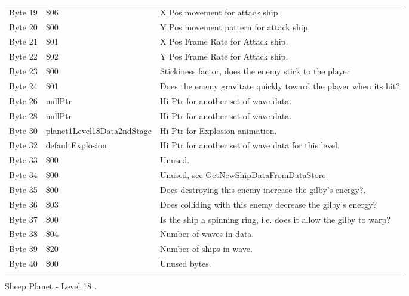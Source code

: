 \begin{figure}[H]
{\begin{adjustbox}{width=12cm}
\begin{tabular}{lll}
 Byte 19 & \$06                        & X Pos movement for attack ship.                                    \\
 Byte 20 & \$00                        & Y Pos movement pattern for attack ship.                            \\
 Byte 21 & \$01                        & X Pos Frame Rate for Attack ship.                                  \\
 Byte 22 & \$02                        & Y Pos Frame Rate for Attack ship.                                  \\
 Byte 23 & \$00                        & Stickiness factor, does the enemy stick to the player              \\
 Byte 24 & \$01                        & Does the enemy gravitate quickly toward the player when its hit?   \\
 Byte 26 & nullPtr                    & Hi Ptr for another set of wave data.                               \\
 Byte 28 & nullPtr                    & Hi Ptr for another set of wave data.                               \\
 Byte 30 & planet1Level18Data2ndStage & Hi Ptr for Explosion animation.                                    \\
 Byte 32 & defaultExplosion           & Hi Ptr for another set of wave data for this level.                \\
 Byte 33 & \$00                        & Unused.                                                            \\
 Byte 34 & \$00                        & Unused, see GetNewShipDataFromDataStore.                           \\
 Byte 35 & \$00                        & Does destroying this enemy increase the gilby's energy?.           \\
 Byte 36 & \$03                        & Does colliding with this enemy decrease the gilby's energy?        \\
 Byte 37 & \$00                        & Is the ship a spinning ring, i.e. does it allow the gilby to warp? \\
 Byte 38 & \$04                        & Number of waves in data.                                           \\
 Byte 39 & \$20                        & Number of ships in wave.                                           \\
 Byte 40 & \$00                        & Unused bytes.                                                      \\
\bottomrule
\end{tabular}

  \end{adjustbox}

  }\caption*{Sheep Planet - Level 18
.}
\end{figure}


